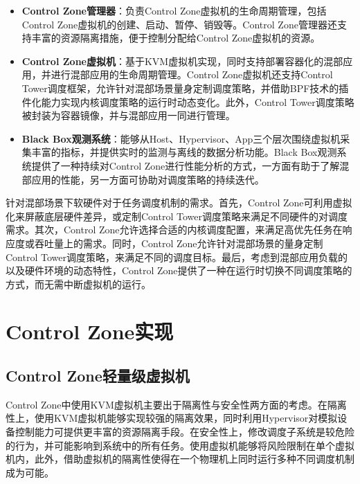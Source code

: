 \begin{itemize}

    \item \textbf{Control Zone管理器}：负责Control Zone虚拟机的生命周期管理，包括Control Zone虚拟机的创建、启动、暂停、销毁等。Control Zone管理器还支持丰富的资源隔离措施，便于控制分配给Control Zone虚拟机的资源。

    \item \textbf{Control Zone虚拟机}：基于KVM虚拟机实现，同时支持部署容器化的混部应用，并进行混部应用的生命周期管理。Control Zone虚拟机还支持Control Tower调度框架，允许针对混部场景量身定制调度策略，并借助BPF技术的插件化能力实现内核调度策略的运行时动态变化。此外，Control Tower调度策略被封装为容器镜像，并与混部应用一同进行管理。

    \item \textbf{Black Box观测系统}：能够从Host、Hypervisor、App三个层次围绕虚拟机采集丰富的指标，并提供实时的监测与离线的数据分析功能。Black Box观测系统提供了一种持续对Control Zone进行性能分析的方式，一方面有助于了解混部应用的性能，另一方面可协助对调度策略的持续迭代。

\end{itemize}

针对混部场景下软硬件对于任务调度机制的需求。首先，Control Zone可利用虚拟化来屏蔽底层硬件差异，或定制Control Tower调度策略来满足不同硬件的对调度需求。其次，Control Zone允许选择合适的内核调度配置，来满足高优先任务在响应度或吞吐量上的需求。同时，Control Zone允许针对混部场景的量身定制Control Tower调度策略，来满足不同的调度目标。最后，考虑到混部应用负载的以及硬件环境的动态特性，Control Zone提供了一种在运行时切换不同调度策略的方式，而无需中断虚拟机的运行。

\section{Control Zone实现}

\subsection{Control Zone轻量级虚拟机}


Control Zone中使用KVM虚拟机主要出于隔离性与安全性两方面的考虑。在隔离性上，使用KVM虚拟机能够实现较强的隔离效果，同时利用Hypervisor对模拟设备控制能力可提供更丰富的资源隔离手段。在安全性上，修改调度子系统是较危险的行为，并可能影响到系统中的所有任务。使用虚拟机能够将风险限制在单个虚拟机内，此外，借助虚拟机的隔离性使得在一个物理机上同时运行多种不同调度机制成为可能。

